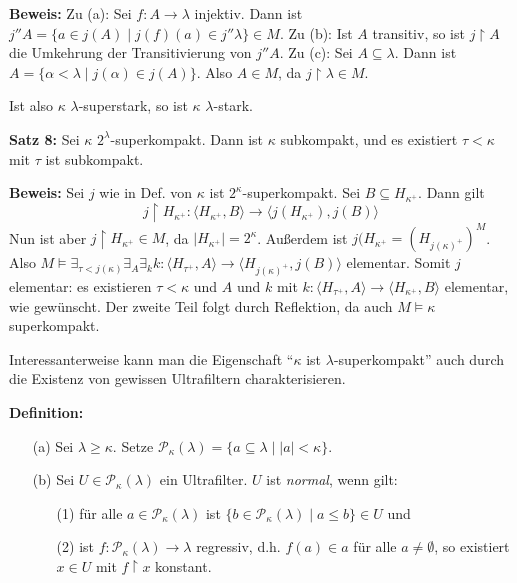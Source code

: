 \documentclass[a4paper,fontsize=11pt]{scrartcl}
\begin{document}
	{\bf Beweis:} Zu (a): Sei $f\colon A\to\lambda$ injektiv.
		Dann ist $j''A=\{a\in j(A)\mid j(f)(a)\in j''\lambda\} \in M$.
		Zu (b): Ist $A$ transitiv, so ist $j\upharpoonright A$ die Umkehrung der Transitivierung von $j''A$.
		Zu (c): Sei $A\subseteq\lambda$. Dann ist $A=\{\alpha<\lambda\mid j(\alpha)\in j(A)\}$.
		Also $A\in M$, da $j\upharpoonright \lambda\in M$.

Ist also $\kappa$ $\lambda$-superstark, so ist $\kappa$ $\lambda$-stark.

{\bf Satz 8:} Sei $\kappa$ $2^\lambda$-superkompakt. Dann ist $\kappa$ subkompakt, und es existiert $\tau<\kappa$ mit $\tau$ ist subkompakt.

	{\bf Beweis:} Sei $j$ wie in Def. von $\kappa$ ist $2^\kappa$-superkompakt. 
		Sei $B\subseteq H_{\kappa^+}$. Dann gilt
		\[ j\upharpoonright H_{\kappa^+}\colon \langle H_{\kappa^+},B\rangle\to\langle j(H_{\kappa^+}), j(B)\rangle \]
		Nun ist aber $j\upharpoonright H_{\kappa^+}\in M$, da $|H_{\kappa^+}|=2^\kappa$.
		Außerdem ist $j(H_{\kappa^+}=(H_{j(\kappa)^+})^M$.
		Also $M\models \exists_{\tau<j(\kappa)} \exists_A\exists_k k\colon\langle H_{\tau^+},A\rangle\to \langle H_{j(\kappa)^+}, j(B)\rangle$ elementar.
		Somit $j$ elementar:
		es existieren $\tau<\kappa$ und $A$ und $k$ mit $k\colon\langle H_{\tau^+},A\rangle \to\langle H_{\kappa^+}, B\rangle$ elementar, wie gewünscht.
		Der zweite Teil folgt durch Reflektion, da auch $M\models\kappa$ superkompakt.

Interessanterweise kann man die Eigenschaft ``$\kappa$ ist $\lambda$-superkompakt'' auch durch die Existenz von gewissen Ultrafiltern charakterisieren.

{\bf Definition:} \begin{itemize}
		\item[(a)] Sei $\lambda\ge \kappa$. Setze $\mathcal P_{\kappa}(\lambda)=\{a\subseteq\lambda\mid |a|<\kappa\}$.
		\item[(b)] Sei $U\in \mathcal P_{\kappa}(\lambda)$ ein Ultrafilter.
			$U$ ist {\em normal}, wenn gilt:
		\begin{itemize}
			\item[(1)] für alle $a\in \mathcal P_{\kappa}(\lambda)$ ist $\{b\in \mathcal P_{\kappa}(\lambda)\mid a\le b\}\in U$ und
			\item[(2)] ist $f\colon \mathcal P_{\kappa}(\lambda)\to\lambda$ regressiv, 
				d.h. $f(a)\in a$ für alle $a\neq \emptyset$, so existiert $x\in U$ mit $f\upharpoonright x$ konstant.
		\end{itemize}
	\end{itemize}
\end{document}
